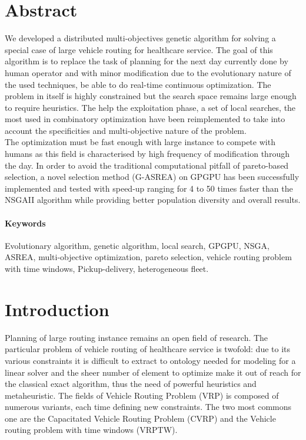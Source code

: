 \documentclass[12pt]{memoir}
\begin{document}
\section{Abstract}
We developed a distributed multi-objectives genetic algorithm for solving a special case of
large vehicle routing for healthcare service. The goal of this algorithm is to
replace the task of planning for the next day currently done by human operator and with
minor modification due to the evolutionary nature of the used techniques, be able to
do real-time continuous optimization. The problem in itself is highly constrained
but the search space remains large enough to require heuristics. The help the
exploitation phase, a set of local searches, the most used in combinatory
optimization have been reimplemented to take into account the specificities and
multi-objective nature of the problem. \\
The optimization must be fast enough with large instance to compete with humans as
this field is characterised by high frequency of modification through the day. In
order to avoid the traditional computational pitfall of pareto-based selection, a
novel selection method (G-ASREA) on GPGPU has been successfully implemented and tested with
speed-up ranging for 4 to 50 times faster than the NSGAII algorithm while providing
better population diversity and overall results.
\paragraph{Keywords}
Evolutionary algorithm, genetic algorithm, local search, GPGPU, NSGA, ASREA, multi-objective optimization, pareto selection, vehicle routing problem with time windows, Pickup-delivery, heterogeneous fleet.

\newpage

\section{Introduction}
Planning of large routing instance remains an open field of research. The particular
problem of vehicle routing of healthcare service is twofold: due to its
various constraints it is difficult to extract to ontology needed for modeling for
a linear solver and the sheer number of element to optimize make it out of reach for
the classical exact algorithm, thus the need of powerful heuristics and 
metaheuristic. The fields of Vehicle Routing Problem (VRP) is composed of numerous variants, each time defining new constraints. The two most commons one are the Capacitated Vehicle Routing Problem (CVRP) and the Vehicle routing problem with time windows (VRPTW).
\end{document}
